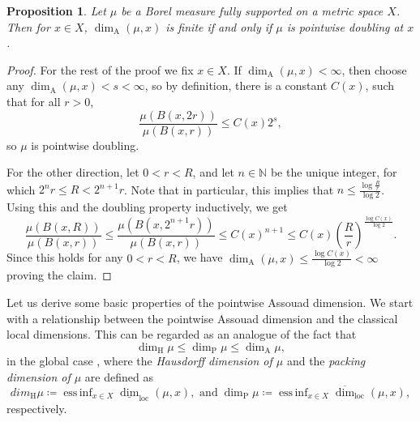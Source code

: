 \documentclass{PRM}
\newcommand{\field}[1]{\mathbb{#1}}
\newcommand{\N}{\field{N}}
\newcommand{\updim}{\overline{\dim}}
\newcommand{\lowdim}{\underline{\dim}}
\newcommand{\adim}{\dim_{\mathrm{A}}}
\DeclareMathOperator*{\essinf}{ess\,inf}
\theoremstyle{plain}
\newtheorem{prop}[thm]{Proposition}
\theoremstyle{definition}
\theoremstyle{remark}
\begin{document}
\begin{prop}\label{prop:loc_doub_assouad}
Let $\mu$ be a Borel measure fully supported on a metric space $X$. Then for $x\in X$, $\dim_{\mathrm{A}}(\mu,x)$ is finite if and only if $\mu$ is pointwise doubling at $x$.
\end{prop}
\begin{proof}
For the rest of the proof we fix $x\in X$. If $\dim_{\mathrm{A}}(\mu,x)<\infty$, then choose any $\dim_{\mathrm{A}}(\mu,x)<s<\infty$, so by definition, there is a constant $C(x)$, such that for all $r>0$,
\begin{equation*}
    \frac{\mu(B(x,2r))}{\mu(B(x,r))}\leq C(x)2^s,
\end{equation*}
so $\mu$ is pointwise doubling.

For the other direction, let $0<r<R$, and let $n\in\N$ be the unique integer, for which $2^{n}r\leq R < 2^{n+1}r$. Note that in particular, this implies that $n\leq \frac{\log\frac{R}{r}}{\log 2}$. Using this and the doubling property inductively, we get
\begin{equation*}
    \frac{\mu(B(x,R))}{\mu(B(x,r))}\leq \frac{\mu(B(x,2^{n+1}r))}{\mu(B(x,r))}\leq C(x)^{n+1}\leq C(x) \left(\frac{R}{r}\right)^{\frac{\log C(x)}{\log 2}}.
\end{equation*}
Since this holds for any $0<r<R$, we have $\dim_{\mathrm{A}}(\mu,x)\leq \frac{\log C(x)}{\log 2}<\infty$ proving the claim.
\end{proof}
Let us derive some basic properties of the pointwise Assouad dimension. We start with a relationship between the pointwise Assouad dimension and the classical local dimensions. This can be regarded as an analogue of the fact that
\begin{equation*}
    \dim_{\mathrm{H}}\mu\leq \dim_{\mathrm{P}}\mu\leq\adim\mu,
\end{equation*}
in the global case \cite{F}, where the \emph{Hausdorff dimension of $\mu$} and the \emph{packing dimension of $\mu$} are defined as 
\begin{equation*}
dim_{\mathrm{H}}\mu\coloneqq\essinf_{x\in X}\lowdim_{\mathrm{loc}}(\mu,x), \text{ and} \;\dim_{\mathrm{P}}\mu\coloneqq\essinf_{x\in X}\updim_{\mathrm{loc}}(\mu,x),
\end{equation*}
respectively.
\end{document}
